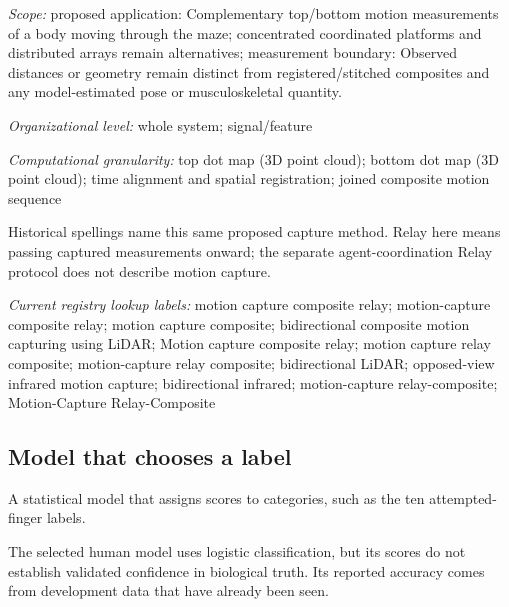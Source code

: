 \noindent\textit{Scope:} proposed application: Complementary top/bottom motion measurements of a body moving through the maze; concentrated coordinated platforms and distributed arrays remain alternatives; measurement boundary: Observed distances or geometry remain distinct from registered/stitched composites and any model-estimated pose or musculoskeletal quantity.\par
\noindent\textit{Organizational level:} whole system; signal/feature\par
\begin{samepage}
\noindent\textit{Computational granularity:} top dot map (3D point cloud); bottom dot map (3D point cloud); time alignment and spatial registration; joined composite motion sequence\par\nopagebreak[4]

\end{samepage}
\noindent Historical spellings name this same proposed capture method. Relay here means passing captured measurements onward; the separate agent-coordination Relay protocol does not describe motion capture.\par


\noindent\textit{Current registry lookup labels:} motion capture composite relay; motion-capture composite relay; motion capture composite; bidirectional composite motion capturing using LiDAR; Motion capture composite relay; motion capture relay composite; motion-capture relay composite; bidirectional LiDAR; opposed-view infrared motion capture; bidirectional infrared; motion-capture relay-composite; Motion-Capture Relay-Composite\par

\begin{samepage}
\subsection*{Model that chooses a label}
\noindent A statistical model that assigns scores to categories, such as the ten attempted-finger labels.\par
\end{samepage}
\begin{samepage}
\noindent The selected human model uses logistic classification, but its scores do not establish validated confidence in biological truth. Its reported accuracy comes from development data that have already been seen.\par\nopagebreak[4]

\end{samepage}



